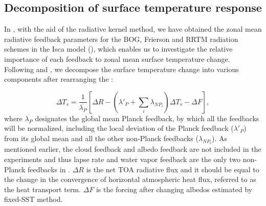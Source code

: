 \subsection{Decomposition of surface temperature response}
\label{sec:climate_feedbacks_temp_decomp}


In , with the aid of the radiative kernel method, we have obtained the zonal mean radiative feedback parameters for the BOG, Frierson and RRTM radiation schemes in the Isca model (), which enables us to investigate the relative importance of each feedback to zonal mean surface temperature change. Following \cite{Feldl2013} and \cite{Kim2018}, we decompose the surface temperature change into various components after rearranging the :


\begin{equation}
	\Delta T_s = \frac{1}{\overline{\lambda_P}}\left[\Delta R -\left(\lambda'_P+\sum_{i}\lambda_{NP_i}\right)\Delta T_s-\Delta F\right],
	\label{eq:decomp_Ts}
\end{equation}
where $\overline{\lambda_P}$ designates the global mean Planck feedback, by which all the feedbacks will be normalized, including the local deviation of the Planck feedback ($\lambda'_P$) from its global mean and all the other non-Planck feedbacks ($\lambda_{NP_i}$). As mentioned earlier, the cloud feedback and albedo feedback are not included in the experiments and thus lapse rate and water vapor feedback are the only two non-Planck feedbacks in . $\Delta R$ is the net TOA radiative flux and it should be equal to the change in the convergence of horizontal atmospheric heat flux, referred to as the heat transport term. $\Delta F$ is the forcing after changing albedos estimated by fixed-SST method.


